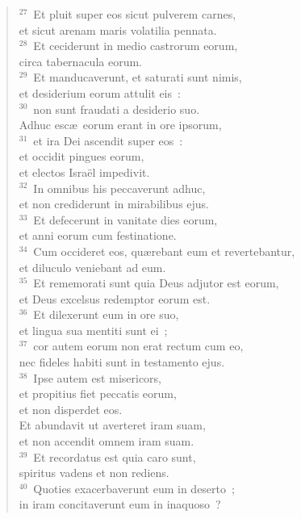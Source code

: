 \begin{flushleft}
\begin{verse}
${}^{27}$~Et pluit super eos sicut pulverem carnes,\\ et sicut arenam maris volatilia pennata.\\
${}^{28}$~Et ceciderunt in medio castrorum eorum,\\ circa tabernacula eorum.\\
${}^{29}$~Et manducaverunt, et saturati sunt nimis,\\ et desiderium eorum attulit eis~:\\
${}^{30}$~non sunt fraudati a desiderio suo.\\ Adhuc esc\ae\ eorum erant in ore ipsorum,\\
${}^{31}$~et ira Dei ascendit super eos~:\\ et occidit pingues eorum,\\ et electos Isra\"el impedivit.\\
${}^{32}$~In omnibus his peccaverunt adhuc,\\ et non crediderunt in mirabilibus ejus.\\
${}^{33}$~Et defecerunt in vanitate dies eorum,\\ et anni eorum cum festinatione.\\
${}^{34}$~Cum occideret eos, qu\ae rebant eum et revertebantur,\\ et diluculo veniebant ad eum.\\
${}^{35}$~Et rememorati sunt quia Deus adjutor est eorum,\\ et Deus excelsus redemptor eorum est.\\
${}^{36}$~Et dilexerunt eum in ore suo,\\ et lingua sua mentiti sunt ei~;\\
${}^{37}$~cor autem eorum non erat rectum cum eo,\\ nec fideles habiti sunt in testamento ejus.\\
${}^{38}$~Ipse autem est misericors,\\ et propitius fiet peccatis eorum,\\ et non disperdet eos.\\ Et abundavit ut averteret iram suam,\\ et non accendit omnem iram suam.\\
${}^{39}$~Et recordatus est quia caro sunt,\\ spiritus vadens et non rediens.\\
${}^{40}$~Quoties exacerbaverunt eum in deserto~;\\ in iram concitaverunt eum in inaquoso~?\\

\end{verse}
\end{flushleft}
